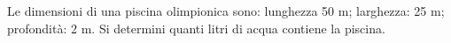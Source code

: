 Le dimensioni di una piscina olimpionica sono: 
lunghezza 50 m;
larghezza: 25 m;
profondità: 2 m.
Si determini quanti litri di acqua contiene la piscina.
